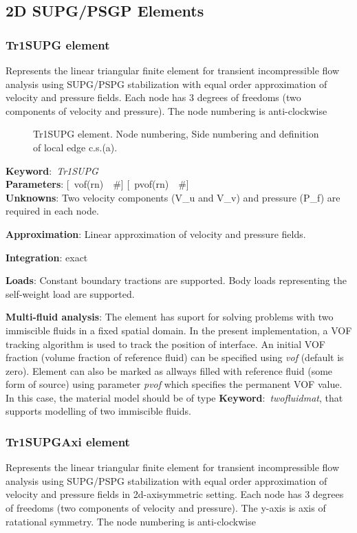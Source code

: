 \documentclass[12pt,dvips]{article}
\newcommand{\descitem}[1]{{\noindent \bf #1}:}
\newcommand{\elemkeyword}[1]{\descitem{Keyword}~{\em #1}}
\newcommand{\elemparam}[2]{{{#1\tiny (#2)}~~\#}}
\newcommand{\optelemparam}[2]{{[~\elemparam{#1}{#2}]}}
\newcommand{\param}[1]{{\it #1}}
\begin{document}
\subsection{2D SUPG/PSGP Elements}
\subsubsection{Tr1SUPG element}
\label{Tr1SUPG}
Represents the linear triangular finite element for transient
incompressible flow analysis using SUPG/PSPG stabilization with equal order
approximation of velocity and pressure fields. Each node has 3 degrees
of freedoms (two components of velocity and pressure).
The node numbering is anti-clockwise

\begin{figure}[tb]
\begin{center}\end{center}
\caption{Tr1SUPG element. Node numbering, Side numbering and
definition of local edge c.s.(a).}
\label{Tr1SUPG2fig}
\end{figure}

\elemkeyword{Tr1SUPG}\\
\descitem{Parameters} \optelemparam{vof}{rn}
\optelemparam{pvof}{rn}\\
\descitem{Unknowns}
Two velocity components (V\_u and V\_v) and pressure (P\_f) are required in each node.

\descitem{Approximation} Linear approximation of velocity and pressure
fields.

\descitem{Integration}
exact

\descitem{Loads} Constant boundary tractions are supported. Body loads
representing the self-weight load are supported.

\descitem{Multi-fluid analysis} The element has suport for solving
problems with two immiscible fluids in
a fixed spatial domain. In the present implementation, a VOF tracking algorithm
is used to track the position of interface. An initial VOF fraction
(volume fraction of reference fluid) can be specified using
\param{vof} (default is zero). Element can also be marked as allways
filled with reference fluid (some form of source) using parameter
\param{pvof} which specifies the permanent VOF value. In this case,
the material model should be of type \elemkeyword{twofluidmat}, that
supports modelling of two immiscible fluids.

\subsubsection{Tr1SUPGAxi element}
\label{Tr1SUPG}
Represents the linear triangular finite element for transient
incompressible flow analysis using SUPG/PSPG stabilization with equal order
approximation of velocity and pressure fields in 2d-axisymmetric setting. Each node has 3 degrees
of freedoms (two components of velocity and pressure). The y-axis is
axis of ratational symmetry. The node numbering is anti-clockwise
\end{document}

